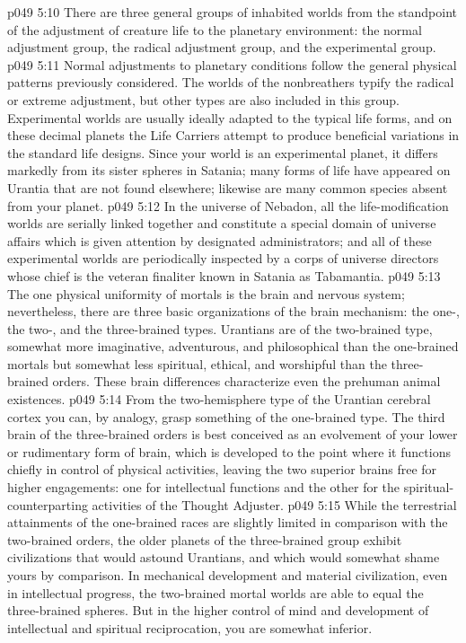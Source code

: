\pc \vs p049 5:10 \bibnobreakspace {} There are three general groups of inhabited worlds from the standpoint of the adjustment of creature life to the planetary environment: the normal adjustment group, the radical adjustment group, and the experimental group.
\vs p049 5:11 Normal adjustments to planetary conditions follow the general physical patterns previously considered. The worlds of the nonbreathers typify the radical or extreme adjustment, but other types are also included in this group. Experimental worlds are usually ideally adapted to the typical life forms, and on these decimal planets the Life Carriers attempt to produce beneficial variations in the standard life designs. Since your world is an experimental planet, it differs markedly from its sister spheres in Satania; many forms of life have appeared on Urantia that are not found elsewhere; likewise are many common species absent from your planet.
\vs p049 5:12 In the universe of Nebadon, all the life\hyp{}modification worlds are serially linked together and constitute a special domain of universe affairs which is given attention by designated administrators; and all of these experimental worlds are periodically inspected by a corps of universe directors whose chief is the veteran finaliter known in Satania as Tabamantia.
\pc \vs p049 5:13 \bibnobreakspace {} The one physical uniformity of mortals is the brain and nervous system; nevertheless, there are three basic organizations of the brain mechanism: the one-, the two-, and the three\hyp{}brained types. Urantians are of the two\hyp{}brained type, somewhat more imaginative, adventurous, and philosophical than the one\hyp{}brained mortals but somewhat less spiritual, ethical, and worshipful than the three\hyp{}brained orders. These brain differences characterize even the prehuman animal existences.
\vs p049 5:14 From the two\hyp{}hemisphere type of the Urantian cerebral cortex you can, by analogy, grasp something of the one\hyp{}brained type. The third brain of the three\hyp{}brained orders is best conceived as an evolvement of your lower or rudimentary form of brain, which is developed to the point where it functions chiefly in control of physical activities, leaving the two superior brains free for higher engagements: one for intellectual functions and the other for the spiritual\hyp{}counterparting activities of the Thought Adjuster.
\vs p049 5:15 While the terrestrial attainments of the one\hyp{}brained races are slightly limited in comparison with the two\hyp{}brained orders, the older planets of the three\hyp{}brained group exhibit civilizations that would astound Urantians, and which would somewhat shame yours by comparison. In mechanical development and material civilization, even in intellectual progress, the two\hyp{}brained mortal worlds are able to equal the three\hyp{}brained spheres. But in the higher control of mind and development of intellectual and spiritual reciprocation, you are somewhat inferior.

